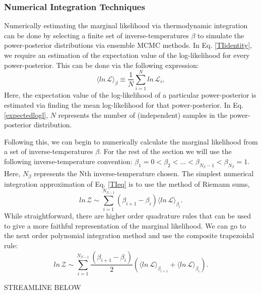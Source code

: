 \subsubsection{Numerical Integration Techniques}\label{subsubsec:NumTI}

Numerically estimating the marginal likelihood via thermodynamic integration can be done by selecting a finite set of inverse-temperatures $\beta$ to simulate the power-posterior distributions via ensemble MCMC methods. In Eq. \ref{TIidentity}, we require an estimation of the expectation value of the log-likelihood for every power-posterior. This can be done via the following expression:
\begin{equation}\label{expectedlogl}
    \langle ln \, \mathcal{L} \rangle_\beta \equiv \frac{1}{N}\sum^N_{i=1} ln \, \mathcal{L}_i,
\end{equation}
Here, the expectation value of the log-likelihood of a particular power-posterior is estimated via finding the mean log-likelihood for that power-posterior. In Eq.\ref{expectedlogl}, $N$ represents the number of (independent) samples in the power-posterior distribution.

Following this, we can begin to numerically calculate the marginal likelihood from a set of inverse-temperatures $\beta$. For the rest of the section we will use the following inverse-temperature convention: $\beta_1=0 < \beta_2 < ... < \beta_{N_\beta -1} < \beta_{N_\beta} = 1$. Here, $N_\beta$ represents the Nth inverse-temperature chosen. The simplest numerical integration approximation of Eq. \ref{TIeq} is to use the method of Riemann sums,
\begin{equation}\label{TIRiemann}
    ln \, \mathcal{Z} \sim \sum^{N_{\beta-1}}_{i=1} \left( \beta_{i+1} - \beta_{i} \right ) \langle ln \, \mathcal{L} \rangle_{\beta_i}.
\end{equation}
While straightforward, there are higher order quadrature rules that can be used to give a more faithful representation of the marginal likelihood. We can go to the next order polynomial integration method and use the composite trapezoidal rule:
\begin{equation}\label{TITrapz}
    ln \, \mathcal{Z} \sim \sum^{N_{\beta-1}}_{i=1} \frac{\left( \beta_{i+1} - \beta_{i} \right )}{2}  \left(\langle ln \, \mathcal{L} \rangle_{\beta_{i+1}} + \langle ln \, \mathcal{L} \rangle_{\beta_i} \right).
\end{equation}

STREAMLINE BELOW

